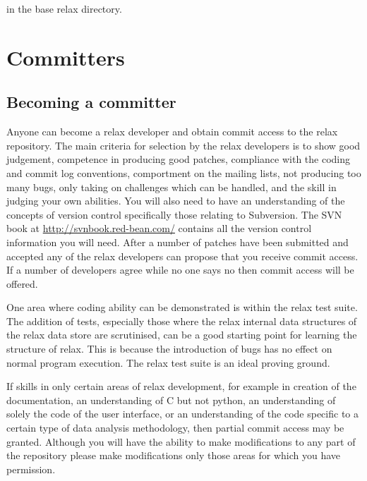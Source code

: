 
in the base relax directory.




\section{Committers}


\subsection{Becoming a committer}\label{becoming a committer}

Anyone can become a relax developer and obtain commit access to the relax repository.  The main criteria for selection by the relax developers is to show good judgement, competence in producing good patches, compliance with the coding and commit log conventions, comportment on the mailing lists, not producing too many bugs, only taking on challenges which can be handled, and the skill in judging your own abilities.  You will also need to have an understanding of the concepts of version control specifically those relating to Subversion.  The SVN book at \href{http://svnbook.red-bean.com/}{http://svnbook.red-bean.com/} contains all the version control information you will need.  After a number of patches have been submitted and accepted any of the relax developers can propose that you receive commit access.  If a number of developers agree while no one says no then commit access will be offered.

One area where coding ability can be demonstrated is within the relax test suite.  The addition of tests, especially those where the relax internal data structures of the relax data store are scrutinised, can be a good starting point for learning the structure of relax.  This is because the introduction of bugs has no effect on normal program execution.  The relax test suite is an ideal proving ground.

If skills in only certain areas of relax development, for example in creation of the documentation, an understanding of C but not python, an understanding of solely the code of the user interface, or an understanding of the code specific to a certain type of data analysis methodology, then partial commit access may be granted.  Although you will have the ability to make modifications to any part of the repository please make modifications only those areas for which you have permission.



